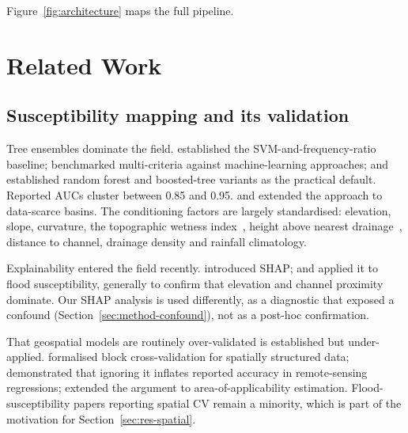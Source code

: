 \documentclass[11pt,a4paper]{article}
\begin{document}
Figure~\ref{fig:architecture} maps the full pipeline.

\section{Related Work}
\label{sec:related}

\subsection{Susceptibility mapping and its validation}
Tree ensembles dominate the field. \citet{tehrany2014} established the
SVM-and-frequency-ratio baseline; \citet{khosravi2018} benchmarked multi-criteria
against machine-learning approaches; \citet{arabameri2019} and \citet{saha2021}
established random forest and boosted-tree variants as the practical default.
Reported AUCs cluster between 0.85 and 0.95. \citet{wang2020} and
\citet{avand2021} extended the approach to data-scarce basins.
The conditioning factors are largely standardised: elevation, slope, curvature,
the topographic wetness index~\citep{beven1979}, height above nearest
drainage~\citep{renno2008,nobre2011}, distance to channel, drainage density and
rainfall climatology.

Explainability entered the field recently. \citet{lundberg2017} introduced SHAP;
\citet{aydin2022} and \citet{seydi2023} applied it to flood susceptibility,
generally to confirm that elevation and channel proximity dominate. Our SHAP
analysis is used differently, as a diagnostic that exposed a confound
(Section~\ref{sec:method-confound}), not as a post-hoc confirmation.

That geospatial models are routinely over-validated is established but
under-applied. \citet{roberts2017} formalised block cross-validation for
spatially structured data; \citet{ploton2020} demonstrated that ignoring it
inflates reported accuracy in remote-sensing regressions; \citet{meyer2021}
extended the argument to area-of-applicability estimation. Flood-susceptibility
papers reporting spatial CV remain a minority, which is part of the motivation
for Section~\ref{sec:res-spatial}.
\end{document}
